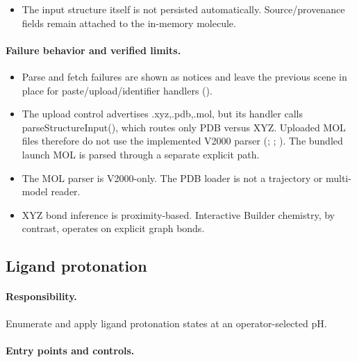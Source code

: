 \documentclass[11pt]{article}
\begin{document}
\begin{small}
\begin{itemize}[leftmargin=*]
\item The input structure itself is not persisted automatically. Source/provenance fields remain attached to the in-memory molecule.

\end{itemize}

\paragraph{Failure behavior and verified limits.}

\begin{itemize}[leftmargin=*]

\item Parse and fetch failures are shown as notices and leave the previous scene in place for paste/upload/identifier handlers ().

\item The upload control advertises .xyz,.pdb,.mol, but its handler calls parseStructureInput(), which routes only PDB versus XYZ. Uploaded MOL files therefore do not use the implemented V2000 parser (; ; ). The bundled launch MOL is parsed through a separate explicit path.

\item The MOL parser is V2000-only. The PDB loader is not a trajectory or multi-model reader.

\item XYZ bond inference is proximity-based. Interactive Builder chemistry, by contrast, operates on explicit graph bonds.

\end{itemize}

\subsection{Ligand protonation}\label{appB:sec5}

\paragraph{Responsibility.}

Enumerate and apply ligand protonation states at an operator-selected pH.

\paragraph{Entry points and controls.}


\end{small}
\end{document}
